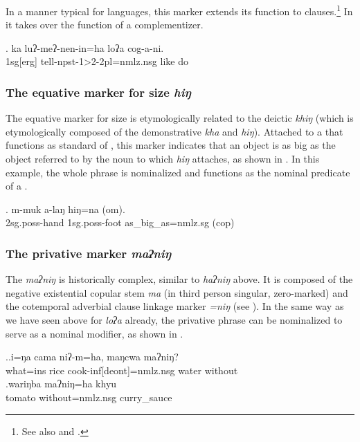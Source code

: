   In a manner typical for  languages, this marker extends its function to clauses.\footnote{See also \citet{DeLancey1985_Etymological} and \citet{Genetti1991From}.} In \Next it takes over the function of a complementizer.
  
  \exg. ka luʔ-meʔ-nen-in=ha loʔa  cog-a-ni.\\
  {\sc 1sg[erg]}  tell{\sc -npst-1>2-2pl=nmlz.nsg} like do\\
   

  
\subsubsection{The equative marker for size \emph{hiŋ}}

The equative marker for size is etymologically related to the deictic  \emph{khiŋ} (which is etymologically composed of the demonstrative \emph{kha} and \emph{hiŋ}). Attached to a  that functions as standard of , this  marker indicates that an object is as big as the  object referred to by the noun to which \emph{hiŋ} attaches, as shown in \Next. In this example, the whole phrase is nominalized and functions as the nominal predicate of a .

	\exg. m-muk a-laŋ hiŋ=na (om).\\
 {\sc 2sg.poss-}hand {\sc 1sg.poss-}foot 	as\_big\_as{\sc =nmlz.sg} ({\sc cop})	\\

\subsubsection{The privative marker \emph{maʔniŋ}}

The \emph{maʔniŋ} is historically complex, similar to \emph{haʔniŋ} above. It is composed of the negative existential copular stem \emph{ma} (in third person singular, zero-marked) and  the cotemporal adverbial clause linkage marker \emph{=niŋ} (see \Next). In the same way as we have seen above for \emph{loʔa} already, the privative phrase can be nominalized to serve as a nominal modifier, as shown in \Next[b].
  
  \ex.\ag.i=ŋa      cama        niʔ-m=ha,     maŋcwa maʔniŋ?\\
  what{\sc =ins} rice cook{\sc -inf[deont]=nmlz.nsg} water without\\
 
\bg.wariŋba maʔniŋ=ha khyu\\
tomato without{\sc =nmlz.nsg} curry\_sauce\\
  
